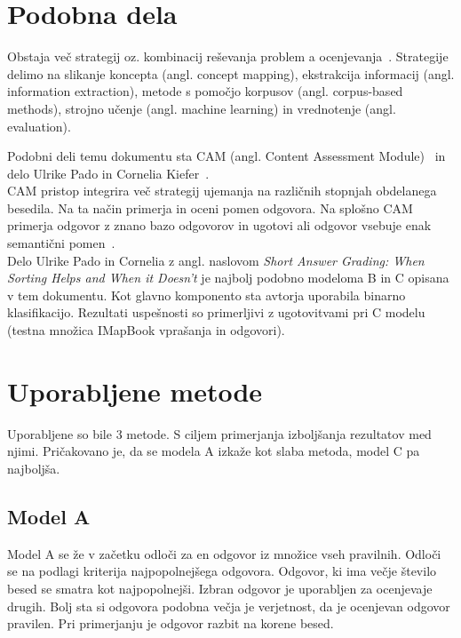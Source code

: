 \documentclass[journal]{IEEEtran}
\begin{document}
\section{Podobna dela}
Obstaja več strategij oz. kombinacij reševanja problem a ocenjevanja~\cite{adhya2016automated}.
Strategije delimo na slikanje koncepta (angl. concept mapping), ekstrakcija informacij (angl. information extraction), metode s pomočjo korpusov (angl. corpus-based methods), strojno učenje (angl. machine learning) in vrednotenje (angl. evaluation).

Podobni deli temu dokumentu sta CAM (angl. Content Assessment Module)~\cite{bailey2008content} in delo Ulrike Pado in Cornelia Kiefer~\cite{Kiefer}.\\

CAM pristop integrira več strategij ujemanja na različnih stopnjah obdelanega besedila. Na ta način primerja in oceni pomen odgovora.
Na splošno CAM primerja odgovor z znano bazo odgovorov in ugotovi ali odgovor vsebuje enak semantični pomen~\cite{bailey2008diagnosing}.\\

Delo Ulrike Pado in Cornelia z angl. naslovom \textit{Short Answer Grading: When Sorting Helps and When it Doesn’t} je najbolj podobno modeloma B in C opisana v tem dokumentu. Kot glavno komponento sta avtorja uporabila binarno klasifikacijo. Rezultati uspešnosti so primerljivi z ugotovitvami pri C modelu (testna množica IMapBook vprašanja in odgovori).

\section{Uporabljene metode}
Uporabljene so bile 3 metode. S ciljem primerjanja izboljšanja rezultatov med njimi. Pričakovano je, da se modela A izkaže kot slaba metoda, model C pa najboljša.

\subsection{Model A}
Model A se že v začetku odloči za en odgovor iz množice vseh pravilnih. Odloči se na podlagi kriterija najpopolnejšega odgovora. Odgovor, ki ima večje število besed se smatra kot najpopolnejši.
Izbran odgovor je uporabljen za ocenjevaje drugih. Bolj sta si odgovora podobna večja je verjetnost, da je ocenjevan odgovor pravilen. Pri primerjanju je odgovor razbit na korene besed.
\end{document}

